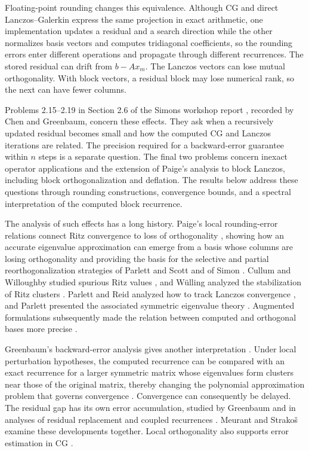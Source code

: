 \documentclass[11pt]{article}
\theoremstyle{definition}
\begin{document}
Floating-point rounding changes this equivalence. Although CG and direct
Lanczos--Galerkin express the same projection in exact arithmetic, one
implementation updates a residual and a search direction while the other
normalizes basis vectors and computes tridiagonal coefficients, so the
rounding errors enter different operations and propagate through different
recurrences. The stored residual can drift from $b-Ax_m$. The Lanczos
vectors can lose mutual orthogonality. With block vectors, a residual block
may lose numerical rank, so the next can have fewer columns.

Problems 2.15--2.19 in Section 2.6 of the Simons workshop report
\cite{OpenProblems2026}, recorded by Chen and Greenbaum, concern these
effects. They ask when a recursively updated residual becomes small and how
the computed CG and Lanczos iterations are related. The precision required
for a backward-error guarantee within $n$ steps is a separate question.
The final two problems concern inexact operator applications and the extension
of Paige's analysis to block Lanczos, including block orthogonalization and
deflation. The results below address these questions through rounding
constructions, convergence bounds, and a spectral interpretation of the
computed block recurrence.

The analysis of such effects has a long history. Paige's local rounding-error
relations connect Ritz convergence to loss of orthogonality
\cite{Paige1976,Paige1980}, showing how an accurate eigenvalue approximation
can emerge from a basis whose columns are losing orthogonality and providing
the basis for the selective and partial reorthogonalization strategies of
Parlett and Scott and of Simon \cite{ParlettScott1979,Simon1984Reorth}.
Cullum and Willoughby studied spurious Ritz values
\cite{CullumWilloughby1980,CullumWilloughby1985}, and W\"ulling analyzed
the stabilization of Ritz clusters \cite{Wulling2005,Wulling2005BIT}.
Parlett and Reid analyzed how to track Lanczos convergence
\cite{ParlettReid1981}, and Parlett presented the associated symmetric
eigenvalue theory \cite{Parlett1998}.
Augmented formulations subsequently made the relation between computed and
orthogonal bases more precise
\cite{Paige2010Augmented,Paige2019,Paige2024,ChangPaigeTitleyPeloquin2021}.

Greenbaum's backward-error analysis gives another interpretation
\cite{Greenbaum1989}. Under local perturbation hypotheses, the computed
recurrence can be compared with an exact recurrence for a larger symmetric
matrix whose eigenvalues form clusters near those of the original matrix,
thereby changing the polynomial approximation problem that governs convergence
\cite{GreenbaumStrakos1992,Strakos1991,Notay1993,GergelitsStrakos2014}.
Convergence can consequently be delayed.
The residual gap has its own error accumulation, studied by Greenbaum
\cite{Greenbaum1997Residual} and in analyses of residual replacement and
coupled recurrences \cite{SleijpenVanderVorst1996,VanderVorstYe2000,
SleijpenVanderVorstModersitzki2000,GutknechtStrakos2000}.
Meurant and Strako\v{s} \cite{MeurantStrakos2006} examine these developments
together. Local orthogonality also supports error estimation in CG
\cite{StrakosTichy2002,StrakosTichy2005,MeurantTichy2024}.
\end{document}
